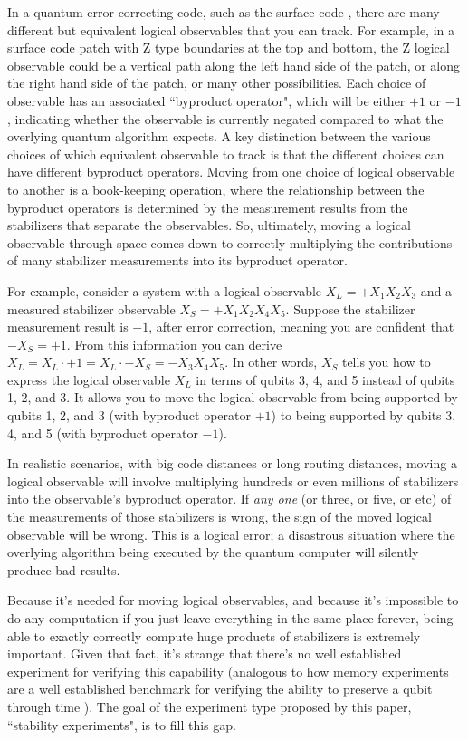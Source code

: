 \documentclass[onecolumn,unpublished,a4paper]{quantumarticle}
\theoremstyle{definition}
\theoremstyle{definition}
\theoremstyle{definition}
\begin{document}
In a quantum error correcting code, such as the surface code \cite{fowler2012surfacecodereview}, there are many different but equivalent logical observables that you can track.
For example, in a surface code patch with Z type boundaries at the top and bottom, the Z logical observable could be a vertical path along the left hand side of the patch, or along the right hand side of the patch, or many other possibilities.
Each choice of observable has an associated ``byproduct operator", which will be either $+1$ or $-1$, indicating whether the observable is currently negated compared to what the overlying quantum algorithm expects.
A key distinction between the various choices of which equivalent observable to track is that the different choices can have different byproduct operators.
Moving from one choice of logical observable to another is a book-keeping operation, where the relationship between the byproduct operators is determined by the measurement results from the stabilizers that separate the observables.
So, ultimately, moving a logical observable through space comes down to correctly multiplying the contributions of many stabilizer measurements into its byproduct operator.

For example, consider a system with a logical observable $X_L = +X_1 X_2 X_3$ and a measured stabilizer observable $X_S = +X_1 X_2 X_4 X_5$.
Suppose the stabilizer measurement result is $-1$, after error correction, meaning you are confident that $-X_S = +1$.
From this information you can derive $X_L = X_L \cdot +1 = X_L \cdot -X_S = -X_3X_4 X_5$.
In other words, $X_S$ tells you how to express the logical observable $X_L$ in terms of qubits 3, 4, and 5 instead of qubits 1, 2, and 3.
It allows you to move the logical observable from being supported by qubits 1, 2, and 3 (with byproduct operator $+1$) to being supported by qubits 3, 4, and 5 (with byproduct operator $-1$).

In realistic scenarios, with big code distances or long routing distances, moving a logical observable will involve multiplying hundreds or even millions of stabilizers into the observable's byproduct operator.
If \emph{any one} (or three, or five, or etc) of the measurements of those stabilizers is wrong, the sign of the moved logical observable will be wrong.
This is a logical error; a disastrous situation where the overlying algorithm being executed by the quantum computer will silently produce bad results.

Because it's needed for moving logical observables, and because it's impossible to do any computation if you just leave everything in the same place forever, being able to exactly correctly compute huge products of stabilizers is extremely important.
Given that fact, it's strange that there's no well established experiment for verifying this capability (analogous to how memory experiments are a well established benchmark for verifying the ability to preserve a qubit through time \cite{chen2021exponential,ryan2021realization,zhao2021realizing,krinner2021realizing,andersen2020repeated}).
The goal of the experiment type proposed by this paper, ``stability experiments", is to fill this gap.
\end{document}

